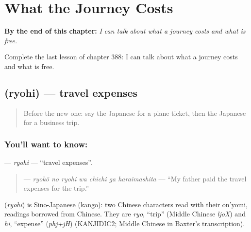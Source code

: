 
\chapter{What the Journey Costs}
\label{ch:ja-what-the-journey-costs}

\begin{chapteropening}
\textbf{By the end of this chapter:} \emph{I can talk about what a journey costs and what is free.}

Complete the last lesson of chapter 388: I can talk about what a journey costs and what is free.
\end{chapteropening}

\section[\texorpdfstring{\ja{りょひ} (ryohi)}{りょひ (ryohi)}]{ (ryohi) — travel expenses}

\label{lesson:JA-C388-ryohi}



\begin{quote}
Before the new one: say the Japanese for a plane ticket, then the Japanese for a business trip.
\end{quote}

\subsection*{You'll want to know: }
\textbf{} — \emph{ryohi} — \textquotedblleft{}travel expenses\textquotedblright{}.

\begin{quote}
\textbf{   } — \emph{ryokō no ryohi wa chichi ga haraimashita} — \textquotedblleft{}My father paid the travel expenses for the trip.\textquotedblright{}
\end{quote}

\begin{cousinweb}
\textbf{} (\emph{ryohi}) is Sino-Japanese (kango): two Chinese characters read with their on'yomi, readings borrowed from Chinese. They are \emph{ryo}, \textquotedblleft{}trip\textquotedblright{} (Middle Chinese \emph{ljoX}) and \emph{hi}, \textquotedblleft{}expense\textquotedblright{} (\emph{phj+jH}) (KANJIDIC2; Middle Chinese in Baxter's transcription).
\end{cousinweb}

